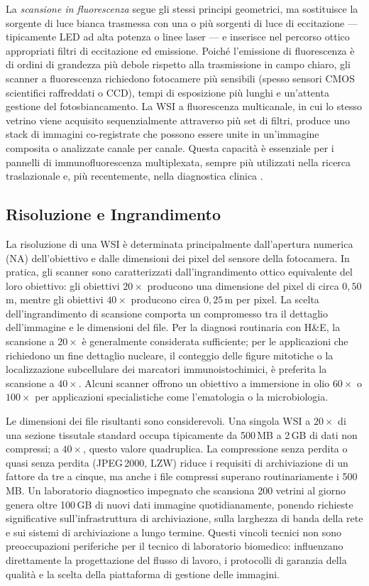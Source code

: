 La \emph{scansione in fluorescenza} segue gli stessi principi geometrici, ma sostituisce la sorgente di luce bianca trasmessa con una o più sorgenti di luce di eccitazione --- tipicamente LED ad alta potenza o linee laser --- e inserisce nel percorso ottico appropriati filtri di eccitazione ed emissione. Poiché l'emissione di fluorescenza è di ordini di grandezza più debole rispetto alla trasmissione in campo chiaro, gli scanner a fluorescenza richiedono fotocamere più sensibili (spesso sensori CMOS scientifici raffreddati o CCD), tempi di esposizione più lunghi e un'attenta gestione del fotosbiancamento. La WSI a fluorescenza multicanale, in cui lo stesso vetrino viene acquisito sequenzialmente attraverso più set di filtri, produce uno stack di immagini co-registrate che possono essere unite in un'immagine composita o analizzate canale per canale. Questa capacità è essenziale per i pannelli di immunofluorescenza multiplexata, sempre più utilizzati nella ricerca traslazionale e, più recentemente, nella diagnostica clinica \cite{bera2019}.

\subsection{Risoluzione e Ingrandimento}

La risoluzione di una WSI è determinata principalmente dall'apertura numerica (NA) dell'obiettivo e dalle dimensioni dei pixel del sensore della fotocamera. In pratica, gli scanner sono caratterizzati dall'ingrandimento ottico equivalente del loro obiettivo: gli obiettivi $20\times$ producono una dimensione del pixel di circa $0{,}50$\,\textmu m, mentre gli obiettivi $40\times$ producono circa $0{,}25$\,\textmu m per pixel. La scelta dell'ingrandimento di scansione comporta un compromesso tra il dettaglio dell'immagine e le dimensioni del file. Per la diagnosi routinaria con H\&E, la scansione a $20\times$ è generalmente considerata sufficiente; per le applicazioni che richiedono un fine dettaglio nucleare, il conteggio delle figure mitotiche o la localizzazione subcellulare dei marcatori immunoistochimici, è preferita la scansione a $40\times$. Alcuni scanner offrono un obiettivo a immersione in olio $60\times$ o $100\times$ per applicazioni specialistiche come l'ematologia o la microbiologia.

Le dimensioni dei file risultanti sono considerevoli. Una singola WSI a $20\times$ di una sezione tissutale standard occupa tipicamente da 500\,MB a 2\,GB di dati non compressi; a $40\times$, questo valore quadruplica. La compressione senza perdita o quasi senza perdita (JPEG\,2000, LZW) riduce i requisiti di archiviazione di un fattore da tre a cinque, ma anche i file compressi superano routinariamente i 500\,MB. Un laboratorio diagnostico impegnato che scansiona 200 vetrini al giorno genera oltre 100\,GB di nuovi dati immagine quotidianamente, ponendo richieste significative sull'infrastruttura di archiviazione, sulla larghezza di banda della rete e sui sistemi di archiviazione a lungo termine. Questi vincoli tecnici non sono preoccupazioni periferiche per il tecnico di laboratorio biomedico: influenzano direttamente la progettazione del flusso di lavoro, i protocolli di garanzia della qualità e la scelta della piattaforma di gestione delle immagini.

